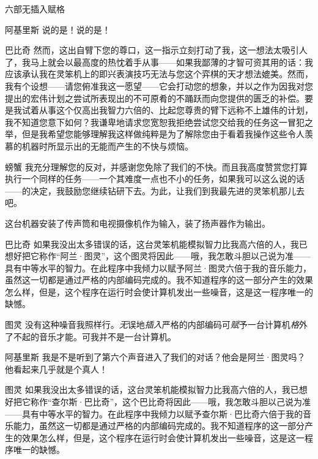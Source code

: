 \begin{dialog}{六部无插入赋格}
\begin{dialogue}
\item[阿基里斯]说的是！说的是！

\item[巴比奇]然而，这出自臂下您的尊口，这一指示立刻打动了我，这一想法太吸引人了，我马上就会以最高度的热忱着手从事——如果我鄙薄的才智可资其用的话：我应该承认我在灵笨机上的即兴表演技巧无法与您这个弈棋的天才想法媲美。然而，我有个设想——请您俯准我这一愿望——它会打动您的想象，并以之作为因我对您提出的宏伟计划之尝试所表现出的不可原肴的不踊跃而向您提供的匮乏的补偿。要是我试着从事这个仅高出我智力六倍的、比起您尊贵的臂下远称不上雄伟的计划，我不知道您意下如何？我谦卑地请求您宽恕我拒绝尝试您交给我的任务这一冒犯之举，但是我希望您能够理解我这样做纯粹是为了解除您由于看着我操作这些令人羡慕的机器时所显示出的无能而产生的不快与烦恼。

\item[螃蟹]我充分理解您的反对，并感谢您免除了我们的不快。而且我高度赞赏您打算执行一个同样的任务——一个其难度一点也不小的任务，如果我可以这么说的话——的决定，我鼓励您继续钻研下去。为此，让我们到我最先进的灵笨机那儿去吧。


这台机器安装了传声筒和电视摄像机作为输入，装了扬声器作为输出。


\item[巴比奇]如果我没出太多错误的话，这台灵笨机能模拟智力比我高六倍的人，我已想好把它称作“阿兰·图灵”，这个图灵将因此——哦，我怎敢斗胆以己说为准——具有中等水平的智力。在此程序中我倾力以赋予阿兰·图灵六倍于我的音乐能力，虽然这一切都是通过严格的内部编码完成的。我不知道程序的这一部分产生的效果怎么样，但是，这个程序在运行时会使计算机发出一些噪音，这是这一程序唯一的缺憾。

\item[图灵]没有这种噪音我照样行。\emph{无}误地\emph{插入}严格的内部编码可\emph{赋}予一台计算机\emph{格}外了不起的音乐才能。可我并不是一台计算机。

\item[阿基里斯]我是不是听到了第六个声音进入了我们的对话？他会是阿兰·图灵吗？他看起来几乎就是个真人！


\item[图灵]如果我没出太多错误的话，这台灵笨机能模拟智力比我高六倍的人，我已想好把它称作“查尔斯·巴比奇”，这个巴比奇将因此——哦，我怎敢斗胆以己说为准——具有中等水平的智力。在此程序中我倾力以赋予查尔斯·巴比奇六倍于我的音乐能力，虽然这一切都是通过严格的内部编码完成的。我不知道程序的这一部分产生的效果怎么样，但是，这个程序在运行时会使计算机发出一些噪音，这是这一程序唯一的缺憾。


\end{dialogue}
\end{dialog}
